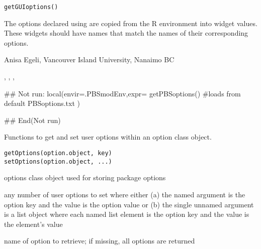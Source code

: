 \documentclass[letterpaper]{book}
\begin{document}
%
\begin{Usage}
\begin{verbatim}
getGUIoptions()
\end{verbatim}
\end{Usage}
%
\begin{Details}\relax
The options declared using  are 
copied from the R environment into widget values. These widgets 
should have names that match the names of their corresponding options.
\end{Details}
%
\begin{Author}\relax
Anisa Egeli, Vancouver Island University, Nanaimo BC
\end{Author}
%
\begin{SeeAlso}\relax
{}, ,
, 
\end{SeeAlso}
%
\begin{Examples}
\begin{ExampleCode}
## Not run: 
local(envir=.PBSmodEnv,expr={
  getPBSoptions() #loads from default PBSoptions.txt
})

## End(Not run)
\end{ExampleCode}
\end{Examples}
%
\begin{Description}\relax
Functions to get and set user options within an option class object.
\end{Description}
%
\begin{Usage}
\begin{verbatim}
getOptions(option.object, key)
setOptions(option.object, ...)
\end{verbatim}
\end{Usage}
%
\begin{Arguments}
\begin{ldescription}
\item[\code{option.object}] options class object used for storing package options
\item[\code{...}] any number of user options to set where either (a) the
named argument is the option key and the value is the option value
or (b) the single unnamed argument is a list object where each named
list element is the option key and the value is the element's value
\item[\code{key}] name of option to retrieve; if missing, all options are returned
\end{ldescription}
\end{Arguments}
\end{document}
